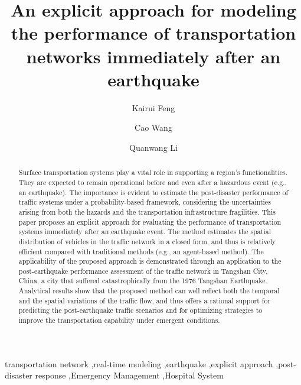 \documentclass[review,11pt,nonatbib]{elsarticle}
\begin{document}

\begin{frontmatter}

\title{An explicit approach for modeling the performance of transportation networks immediately after an earthquake}
\author[add1,add2]{Kairui Feng}
\author[add3]{Cao Wang}
\author[add1]{Quanwang Li}

\address[add1]{Department of Civil Engineering, Tsinghua University, Beijing 100084, China}
\address[add2]{Department of Civil and Environmental Engineering, Princeton University, Princeton, NJ 08540, USA}
\address[add3]{School of Civil, Mining, Environmental and Architectural Engineering, University of Wollongong, Wollongong, NSW 2522, Australia}

\begin{abstract}
  Surface transportation systems play a vital role in supporting a region's functionalities. They are expected to remain operational before and even after a hazardous event (e.g., an earthquake). The importance is evident to estimate the post-disaster performance of traffic systems under a probability-based framework, considering the uncertainties arising from both the hazards and the transportation infrastructure fragilities. This paper proposes an explicit approach for evaluating the performance of transportation systems immediately after an earthquake event. The method estimates the spatial distribution of vehicles in the traffic network in a closed form, and thus is relatively efficient compared with traditional methods (e.g., an agent-based method). The applicability of the proposed approach is demonstrated through an application to the post-earthquake performance assessment of the traffic network in Tangshan City, China, a city that suffered catastrophically from the 1976 Tangshan Earthquake. Analytical results show that the proposed method can well reflect both the temporal and the spatial variations of the traffic flow, and thus offers a rational support for predicting the post-earthquake traffic scenarios and for optimizing strategies to improve the transportation capability under emergent conditions.
\end{abstract}

\begin{keyword}
transportation network \sep real-time modeling \sep earthquake \sep explicit approach \sep post-disaster response \sep Emergency Management \sep Hospital System
\end{keyword}

\end{frontmatter}
\end{document}
